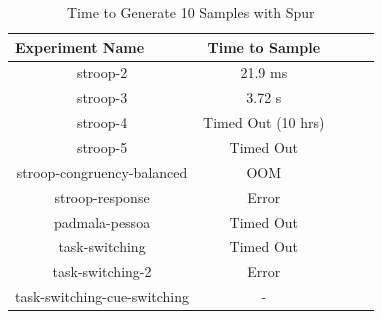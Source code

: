 




\begin{table}[t]
  \centering
  \caption{Time to Generate 10 Samples with Spur}
\begin{tabular}{|c|c|c|c|c|}
\hline
\multicolumn{1}{|l|}{Experiment Name} & Time to Sample                \\ \hline
stroop-2                              & 21.9 ms                       \\ \hline
stroop-3                              & 3.72 s                        \\ \hline
stroop-4                              & Timed Out (10 hrs)            \\ \hline
stroop-5                              & Timed Out                     \\ \hline
stroop-congruency-balanced            & OOM                           \\ \hline  %
stroop-response                       & Error                         \\ \hline  %
padmala-pessoa                        & Timed Out                     \\ \hline  %
task-switching                        & Timed Out                     \\ \hline  %
task-switching-2                      & Error                         \\ \hline  %
task-switching-cue-switching          & -                             \\ \hline  %
\end{tabular}
\label{tab:benchmark_experiments_spur}%
\end{table}


